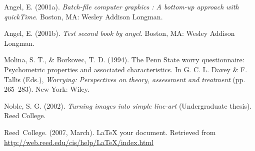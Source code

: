 \documentclass[12pt,twoside]{reedthesis}
\begin{document}
  \hypertarget{ref-angel2001}{}
  Angel, E. (2001a). \emph{Batch-file computer graphics : A bottom-up
  approach with quickTime}. Boston, MA: Wesley Addison Longman.
  
  \hypertarget{ref-angel2002a}{}
  Angel, E. (2001b). \emph{Test second book by angel}. Boston, MA: Wesley
  Addison Longman.
  
  \hypertarget{ref-Molina1994}{}
  Molina, S. T., \& Borkovec, T. D. (1994). The Penn State worry
  questionnaire: Psychometric properties and associated characteristics.
  In G. C. L. Davey \& F. Tallis (Eds.), \emph{Worrying: Perspectives on
  theory, assessment and treatment} (pp. 265--283). New York: Wiley.
  
  \hypertarget{ref-noble2002}{}
  Noble, S. G. (2002). \emph{Turning images into simple line-art}
  (Undergraduate thesis). Reed College.
  
  \hypertarget{ref-reedweb2007}{}
  Reed~College. (2007, March). LaTeX your document. Retrieved from
  \url{http://web.reed.edu/cis/help/LaTeX/index.html}


\end{document}
